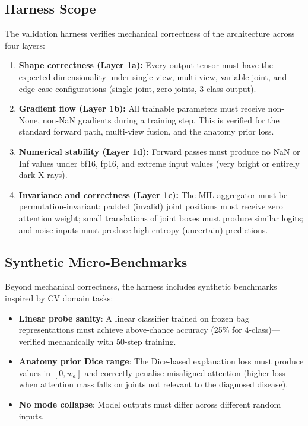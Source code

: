 \documentclass{article}
\begin{document}
\subsection{Harness Scope}
The validation harness verifies mechanical correctness of the architecture across four layers:
\begin{enumerate}
  \item \textbf{Shape correctness (Layer 1a):} Every output tensor must have the expected dimensionality under single-view, multi-view, variable-joint, and edge-case configurations (single joint, zero joints, 3-class output).
  \item \textbf{Gradient flow (Layer 1b):} All trainable parameters must receive non-None, non-NaN gradients during a training step. This is verified for the standard forward path, multi-view fusion, and the anatomy prior loss.
  \item \textbf{Numerical stability (Layer 1d):} Forward passes must produce no NaN or Inf values under bf16, fp16, and extreme input values (very bright or entirely dark X-rays).
  \item \textbf{Invariance and correctness (Layer 1c):} The MIL aggregator must be permutation-invariant; padded (invalid) joint positions must receive zero attention weight; small translations of joint boxes must produce similar logits; and noise inputs must produce high-entropy (uncertain) predictions.
\end{enumerate}

\subsection{Synthetic Micro-Benchmarks}
Beyond mechanical correctness, the harness includes synthetic benchmarks inspired by CV domain tasks:
\begin{itemize}
  \item \textbf{Linear probe sanity}: A linear classifier trained on frozen bag representations must achieve above-chance accuracy (25\% for 4-class)---verified mechanically with 50-step training.
  \item \textbf{Anatomy prior Dice range}: The Dice-based explanation loss must produce values in $[0, w_a]$ and correctly penalise misaligned attention (higher loss when attention mass falls on joints not relevant to the diagnosed disease).
  \item \textbf{No mode collapse}: Model outputs must differ across different random inputs.
\end{itemize}
\end{document}
